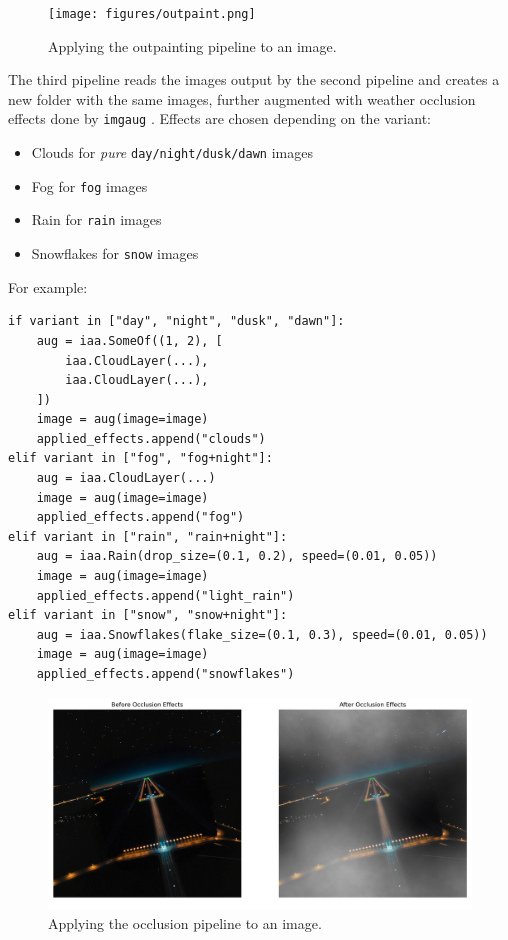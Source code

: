 \begin{figure}[htbp]
\centering
\texttt{[image: figures/outpaint.png]}
  \caption{Applying the outpainting pipeline to an image.}
\label{fig:noise_to_image}
\end{figure}

The third pipeline reads the images output by the second pipeline and creates a new folder with the same images, further augmented with weather occlusion effects done by \texttt{imgaug} \cite{jung_imgaug_2020}. 
Effects are chosen depending on the variant:

\begin{itemize}
\item Clouds for \emph{pure} \texttt{day/night/dusk/dawn} images
\item Fog for \texttt{fog} images
\item Rain for \texttt{rain} images
\item Snowflakes for \texttt{snow} images
\end{itemize}

For example:

\begin{lstlisting}
if variant in ["day", "night", "dusk", "dawn"]:
    aug = iaa.SomeOf((1, 2), [
        iaa.CloudLayer(...),
        iaa.CloudLayer(...),
    ])
    image = aug(image=image)
    applied_effects.append("clouds")
elif variant in ["fog", "fog+night"]:
    aug = iaa.CloudLayer(...)
    image = aug(image=image)
    applied_effects.append("fog")
elif variant in ["rain", "rain+night"]:
    aug = iaa.Rain(drop_size=(0.1, 0.2), speed=(0.01, 0.05))
    image = aug(image=image)
    applied_effects.append("light_rain")
elif variant in ["snow", "snow+night"]:
    aug = iaa.Snowflakes(flake_size=(0.1, 0.3), speed=(0.01, 0.05))
    image = aug(image=image)
    applied_effects.append("snowflakes")
\end{lstlisting}

\begin{figure}[htbp]
\centering
\includegraphics[width=1.0\textwidth]{figures/occlusion.png}
  \caption{Applying the occlusion pipeline to an image.}
\label{fig:noise_to_image}
\end{figure}


